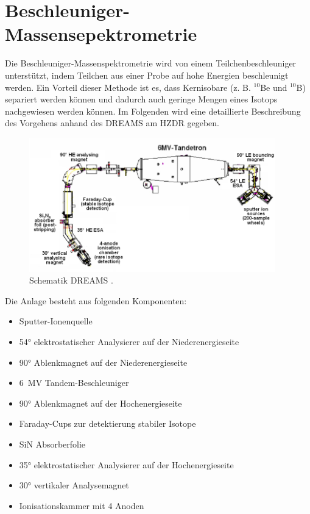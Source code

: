 \section{Beschleuniger-Massensepektrometrie}

Die Beschleuniger-Massenspektrometrie wird von einem Teilchenbeschleuniger unterstützt, indem Teilchen aus einer Probe auf hohe Energien beschleunigt werden.
Ein Vorteil dieser Methode ist es, dass Kernisobare (z. B. $^{10}$Be und $^{10}$B) separiert werden können und dadurch auch geringe Mengen eines Isotops nachgewiesen werden können.
Im Folgenden wird eine detaillierte Beschreibung des Vorgehens anhand des DREAMS am HZDR gegeben.
\begin{figure}[ht]
	\centering
    \includegraphics[width=0.95\textwidth]{Pictures/DREAMS.png}
	\caption{Schematik DREAMS \cite{Bild_DREAMS}.}
	\label{Theorie_Bild_DREAMS}
\end{figure}
Die Anlage besteht aus folgenden Komponenten:
\begin{itemize}
    \item Sputter-Ionenquelle
    \item \ang{54} elektrostatischer Analysierer auf der Niederenergieseite
    \item \ang{90} Ablenkmagnet auf der Niederenergieseite
    \item \SI{6}{\mega\volt} Tandem-Beschleuniger
    \item \ang{90} Ablenkmagnet auf der Hochenergieseite
    \item Faraday-Cups zur detektierung stabiler Isotope
    \item SiN Absorberfolie
    \item \ang{35} elektrostatischer Analysierer auf der Hochenergieseite
    \item \ang{30} vertikaler Analysemagnet
    \item Ionisationskammer mit 4 Anoden
\end{itemize}
